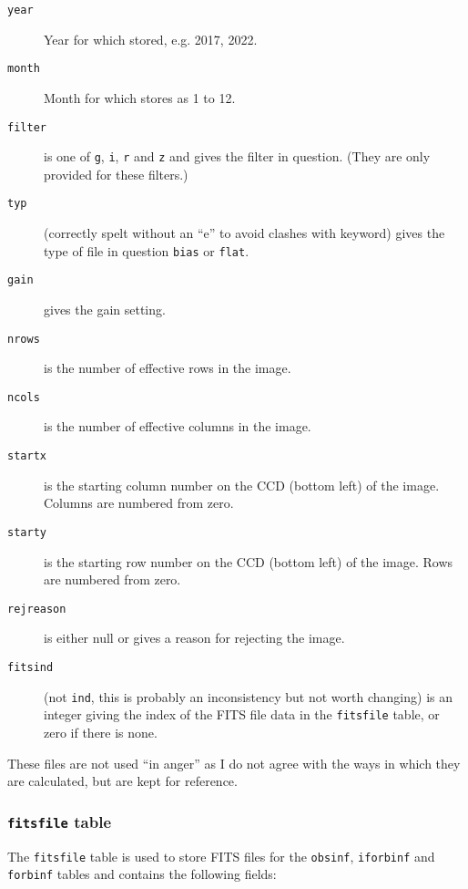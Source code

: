\begin{description}
\item[\tt year] Year for which stored, e.g. 2017, 2022.
\item[\tt month] Month for which stores as 1 to 12.
\item[\tt filter] is one of \texttt{g}, \texttt{i}, \texttt{r} and \texttt{z}
and gives the filter in question. (They are only provided for these filters.)
\item[\tt typ] (correctly spelt without an ``e'' to avoid clashes with {\mysql}
keyword) gives the type of file in question \texttt{bias} or \texttt{flat}.
\item[\tt gain] gives the gain setting.
\item[\tt nrows] is the number of effective rows in the image.
\item[\tt ncols] is the number of effective columns in the image.
\item[\tt startx] is the starting column number on the CCD (bottom left) of the
image. Columns are numbered from zero.
\item[\tt starty] is the starting row number on the CCD (bottom left) of the
image. Rows are numbered from zero.
\item[\tt rejreason] is either null or gives a reason for rejecting the image.
\item[\tt fitsind] (not \texttt{ind}, this is probably an inconsistency but
not worth changing) is an integer giving the index of the FITS file data in the
\texttt{fitsfile} table, or zero if there is none.
\end{description}

These files are not used ``in anger'' as I do not agree with the ways in which
they are calculated, but are kept for reference.

\subsubsection{\texttt{fitsfile} table}
\protect\label{section:fitsfile}

The \texttt{fitsfile} table is used to store FITS files for the \texttt{obsinf},
\texttt{iforbinf} and \texttt{forbinf} tables and contains the following fields:

